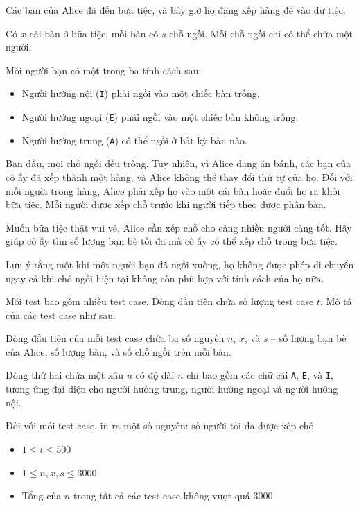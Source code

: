 \documentclass[11pt]{article}
\begin{document}
Các bạn của Alice đã đến bữa tiệc, và bây giờ họ đang xếp hàng để vào dự tiệc.

Có $x$ cái bàn ở bữa tiệc, mỗi bàn có $s$ chỗ ngồi. Mỗi chỗ ngồi chỉ có thể chứa một người.

Mỗi người bạn có một trong ba tính cách sau:
\begin{itemize}
    \item Người hướng nội (\texttt{I}) phải ngồi vào một chiếc bàn trống.
    \item Người hướng ngoại (\texttt{E}) phải ngồi vào một chiếc bàn không trống.
    \item Người hướng trung (\texttt{A}) có thể ngồi ở bất kỳ bàn nào.
\end{itemize}

Ban đầu, mọi chỗ ngồi đều trống. Tuy nhiên, vì Alice đang ăn bánh, các bạn của cô ấy đã xếp thành một hàng, và Alice không thể thay đổi thứ tự của họ. Đối với mỗi người trong hàng, Alice phải xếp họ vào một cái bàn hoặc đuổi họ ra khỏi bữa tiệc. Mỗi người được xếp chỗ trước khi người tiếp theo được phân bàn.

Muốn bữa tiệc thật vui vẻ, Alice cần xếp chỗ cho càng nhiều người càng tốt. Hãy giúp cô ấy tìm số lượng bạn bè tối đa mà cô ấy có thể xếp chỗ trong bữa tiệc.

Lưu ý rằng một khi một người bạn đã ngồi xuống, họ không được phép di chuyển ngay cả khi chỗ ngồi hiện tại không còn phù hợp với tính cách của họ nữa.

\begin{inputbox}
Mỗi test bao gồm nhiều test case. Dòng đầu tiên chứa số lượng test case $t$. Mô tả của các test case như sau.

Dòng đầu tiên của mỗi test case chứa ba số nguyên $n$, $x$, và $s$ – số lượng bạn bè của Alice, số lượng bàn, và số chỗ ngồi trên mỗi bàn.

Dòng thứ hai chứa một xâu $u$ có độ dài $n$ chỉ bao gồm các chữ cái \texttt{A}, \texttt{E}, và \texttt{I}, tương ứng đại diện cho người hướng trung, người hướng ngoại và người hướng nội.
\end{inputbox}

\outputformat
\begin{outputbox}
Đối với mỗi test case, in ra một số nguyên: số người tối đa được xếp chỗ.
\end{outputbox}

\constraints
\begin{constraintbox}
\begin{itemize}
    \item $1 \le t \le 500$
    \item $1 \le n, x, s \le 3000$
    \item Tổng của $n$ trong tất cả các test case không vượt quá $3000$.
\end{itemize}
\end{constraintbox}
\end{document}
